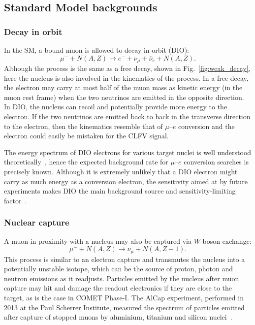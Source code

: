 \subsection{Standard Model backgrounds}
\subsubsection{Decay in orbit}
In the SM, a bound muon is allowed to decay in orbit (DIO):
\begin{equation*}\label{eq:dio}
    \mu^- + N(A, Z) \rightarrow e^- + \nu_\mu + \overline{\nu}_e + N(A, Z).
\end{equation*}
Although the process is the same as a free decay, shown in
Fig.~\ref{fig:weak_decay}, here the nucleus is also involved in the kinematics
of the process. In a free decay, the electron may carry at most half of the muon
mass as kinetic energy (in the muon rest frame) when the two neutrinos are
emitted in the opposite direction. In DIO, the nucleus can recoil and
potentially provide more energy to the electron. If the two neutrinos are
emitted back to back in the transverse direction to the electron, then the
kinematics resemble that of $\mu$--$e$ conversion and the electron could easily
be mistaken for the CLFV signal. 


The energy spectrum of DIO electrons for various target nuclei is well
understood theoretically~\cite{czarnecki}, hence the expected background rate
for $\mu$--$e$ conversion searches is precisely known. Although it is extremely
unlikely that a DIO electron might carry as much energy as a conversion
electron, the sensitivity aimed at by future experiments makes DIO the main
background source and sensitivity-limiting
factor~\cite{the_comet_collaboration_comet_2020}.


\subsubsection{Nuclear capture}
A muon in proximity with a nucleus may also be captured via $W$-boson exchange:
\begin{equation*}\label{eq:capture}
    \mu^- + N(A, Z) \rightarrow \nu_\mu + N(A, Z-1).
\end{equation*}
This process is similar to an electron capture and transmutes the nucleus into a
potentially unstable isotope, which can be the source of proton, photon and
neutron emissions as it readjusts. Particles emitted by the nucleus after muon
capture may hit and damage the readout electronics if they are close to the
target, as is the case in COMET Phase-I. The AlCap experiment, performed in 2013
at the Paul Scherrer Institute, measured the spectrum of particles emitted after
capture of stopped muons by aluminium, titanium and silicon
nuclei~\cite{PhysRevC.105.035501}.


